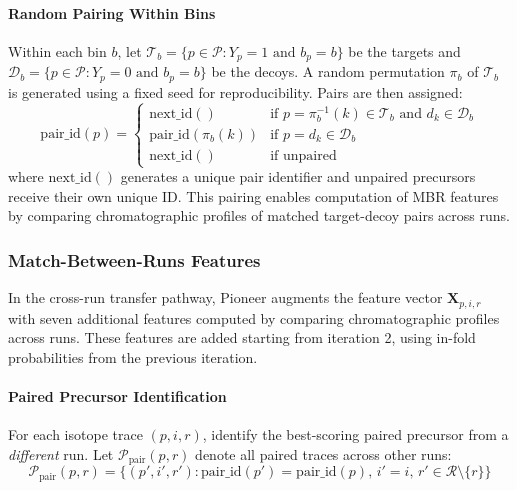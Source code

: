 \documentclass[pdflatex,sn-nature]{sn-jnl}
\begin{document}
\paragraph{Random Pairing Within Bins} Within each bin $b$, let $\mathcal{T}_b = \{p \in \mathcal{P} : Y_p = 1 \text{ and } b_p = b\}$ be the targets and $\mathcal{D}_b = \{p \in \mathcal{P} : Y_p = 0 \text{ and } b_p = b\}$ be the decoys. A random permutation $\pi_b$ of $\mathcal{T}_b$ is generated using a fixed seed for reproducibility. Pairs are then assigned:
\begin{equation}
  \text{pair\_id}(p) = \begin{cases}
      \text{next\_id}() & \text{if } p = \pi_b^{-1}(k) \in \mathcal{T}_b \text{ and } d_k \in \mathcal{D}_b \\
      \text{pair\_id}(\pi_b(k)) & \text{if } p = d_k \in \mathcal{D}_b \\
      \text{next\_id}() & \text{if unpaired}
  \end{cases}
\end{equation}
where $\text{next\_id}()$ generates a unique pair identifier and unpaired precursors receive their own unique ID. This pairing enables computation of MBR features by comparing chromatographic profiles of matched target-decoy pairs across runs.

\subsubsection{Match-Between-Runs Features}\label{sec:mbr_features}

In the cross-run transfer pathway, Pioneer augments the feature vector $\mathbf{X}_{p,i,r}$ with seven additional features computed by comparing chromatographic profiles across runs. These features are added starting from iteration 2, using in-fold probabilities from the previous iteration.

\paragraph{Paired Precursor Identification} For each isotope trace $(p,i,r)$, identify the best-scoring paired precursor from a \emph{different} run. Let $\mathcal{P}_{\text{pair}}(p, r)$ denote all paired traces across other runs:
\begin{equation}
\mathcal{P}_{\text{pair}}(p, r) = \{(p', i', r') : \text{pair\_id}(p') = \text{pair\_id}(p), \, i' = i, \, r' \in \mathcal{R} \setminus \{r\}\}
\end{equation}
\end{document}
